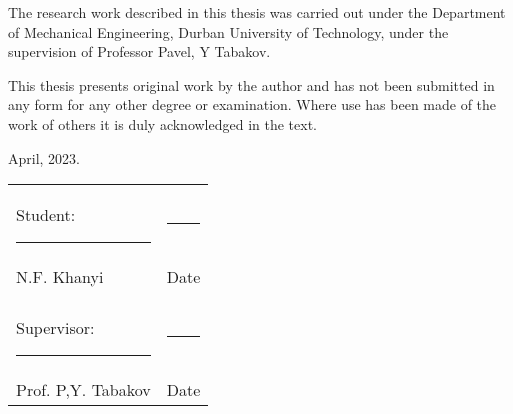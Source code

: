 The research work described in this thesis was carried out under the Department of Mechanical Engineering, Durban University of Technology, under the supervision of Professor Pavel, Y Tabakov.   

This thesis presents original work by the author and has not been submitted in any form for any other degree or examination. Where use has been made of the work of others it is duly acknowledged in the text. \newline

\begin{flushright}
April, 2023.
\end{flushright} 

\vspace{1.7cm}
{\renewcommand{\arraystretch}{1.6}

\begin{tabularx}{\textwidth}{ >{\hsize=1.3\hsize}X >{\hsize=0.5\hsize}X }
Student: \rule{5cm}{0.2mm} & \rule{5cm}{0.2mm}\\
N.F. Khanyi	& Date \\
\\
Supervisor: \rule{5cm}{0.2mm} & \rule{5cm}{0.2mm}\\
Prof. P,Y. Tabakov & Date 
\end{tabularx}}